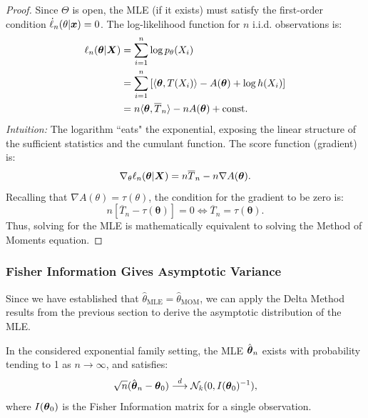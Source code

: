 \begin{proof}
Since $\Theta$ is open, the MLE (if it exists) must satisfy the first-order condition $\dot{\ell}_n(\theta|\boldsymbol{x}) = 0$.
The log-likelihood function for $n$ i.i.d. observations is:
\begin{align*}
\ell_n(\boldsymbol{\theta}|\boldsymbol{X}) &= \sum_{i=1}^n \log p_\theta(X_i) \\
&= \sum_{i=1}^n \left[ \langle \boldsymbol{\theta}, T(X_i) \rangle - A(\boldsymbol{\theta}) + \log h(X_i) \right] \\
&= n \langle \boldsymbol{\theta}, \overline{T}_n \rangle - n A(\boldsymbol{\theta}) + \text{const.}
\end{align*}
\textit{Intuition:} The logarithm ``eats" the exponential, exposing the linear structure of the sufficient statistics and the cumulant function.
The score function (gradient) is:
\[
\nabla_{\theta} \ell_n(\boldsymbol{\theta}|\boldsymbol{X}) = n \overline{T}_n - n \nabla A(\boldsymbol{\theta}).
\]
Recalling that $\nabla A(\theta) = \tau(\theta)$, the condition for the gradient to be zero is:
\[
n \left[ \overline{T}_n - \tau(\boldsymbol{\theta}) \right] = 0 \iff \overline{T}_n = \tau(\boldsymbol{\theta}).
\]
Thus, solving for the MLE is mathematically equivalent to solving the Method of Moments equation.
\end{proof}

\subsubsection{Fisher Information Gives Asymptotic Variance}

Since we have established that $\hat{\theta}_{\text{MLE}} = \hat{\theta}_{\text{MOM}}$, we can apply the Delta Method results from the previous section to derive the asymptotic distribution of the MLE.

\begin{corollary}
In the considered exponential family setting, the MLE $\hat{\boldsymbol{\theta}}_n$ exists with probability tending to 1 as $n \to \infty$, and satisfies:
\[
\sqrt{n}(\hat{\boldsymbol{\theta}}_n - \boldsymbol{\theta}_0) \stackrel{d}{\longrightarrow} \mathcal{N}_k(0, I(\boldsymbol{\theta}_0)^{-1}),
\]
where $I(\boldsymbol{\theta}_0)$ is the Fisher Information matrix for a single observation.
\end{corollary}

